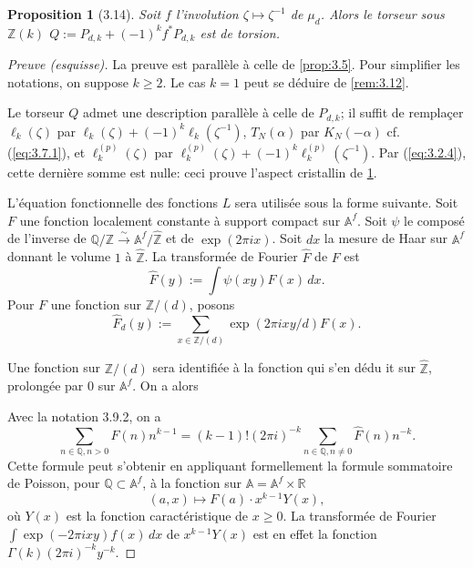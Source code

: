 \documentclass[12pt,a4paper]{article}
\theoremstyle{plain}
\newtheorem{proposition}[theorem]{Proposition}
\theoremstyle{definition}
\theoremstyle{remark}
\begin{document}
\begin{proposition}[3.14]\label{prop:3.14}
Soit $f$ l'involution $\zeta \mapsto \zeta^{-1}$ de $\mu_d$. Alors le torseur sous
$\mathbb{Z}(k)$ $Q := P_{d,k} + (-1)^k f^* P_{d,k}$ est de torsion.
\end{proposition}
\begin{proof}[Preuve (esquisse)]
La preuve est parall\`ele \`a celle de \ref{prop:3.5}. Pour simplifier les notations, on
suppose $k \geq 2$. Le cas $k = 1$ peut se d\'eduire de \ref{rem:3.12}.

Le torseur $Q$ admet une description parall\`ele \`a celle de $P_{d,k}$; il suffit de
rempla\c{c}er $\ell_k(\zeta)$ par $\ell_k(\zeta) + (-1)^k \ell_k(\zeta^{-1})$,
$T_N(\alpha)$ par $K_N(-\alpha)$ cf. (\ref{eq:3.7.1}), et $\ell_k^{(p)}(\zeta)$ par
$\ell_k^{(p)}(\zeta) + (-1)^k \ell_k^{(p)}(\zeta^{-1})$. Par (\ref{eq:3.2.4}), cette
derni\`ere somme est nulle: ceci prouve l'aspect cristallin de \ref{prop:3.14}.

L'\'equation fonctionnelle des fonctions $L$ sera utilis\'ee sous la forme suivante. Soit
$F$ une fonction localement constante \`a support compact sur $\mathbb{A}^f$. Soit
$\psi$ le compos\'e de l'inverse de $\mathbb{Q}/\mathbb{Z} \xrightarrow{\sim}
\mathbb{A}^f/\hat{\mathbb{Z}}$ et de $\exp(2\pi i x)$. Soit $dx$ la mesure de Haar sur
$\mathbb{A}^f$ donnant le volume $1$ \`a $\hat{\mathbb{Z}}$. La transform\'ee de Fourier
$\hat{F}$ de $F$ est
\[
\hat{F}(y) := \int \psi(xy) F(x)\, dx.
\]
Pour $F$ une fonction sur $\mathbb{Z}/(d)$, posons
\[
\hat{F}_d(y) := \sum_{x \in \mathbb{Z}/(d)} \exp(2\pi i xy/d) F(x).
\]

Une fonction sur $\mathbb{Z}/(d)$ sera identifi\'ee \`a la fonction qui s'en d\'edu it sur
$\hat{\mathbb{Z}}$, prolong\'ee par $0$ sur $\mathbb{A}^f$. On a alors

Avec la notation 3.9.2, on a
\begin{equation}\label{eq:3.14.1}
\sum_{n \in \mathbb{Q}, n > 0} F(n) n^{k-1} = (k-1)! (2\pi i)^{-k} \sum_{n \in \mathbb{Q},
n \neq 0} \hat{F}(n) n^{-k}.
\end{equation}
Cette formule peut s'obtenir en appliquant formellement la formule sommatoire de
Poisson, pour $\mathbb{Q} \subset \mathbb{A}^f$, \`a la fonction sur $\mathbb{A} =
\mathbb{A}^f \times \mathbb{R}$
\[
(a,x) \longmapsto F(a) \cdot x^{k-1} Y(x),
\]
o\`u $Y(x)$ est la fonction caract\'eristique de $x \geq 0$. La transform\'ee de Fourier
$\int \exp(-2\pi i xy) f(x)\, dx$ de $x^{k-1} Y(x)$ est en effet la fonction
$\Gamma(k) (2\pi i)^{-k} y^{-k}$.


\end{proof}
\end{document}
